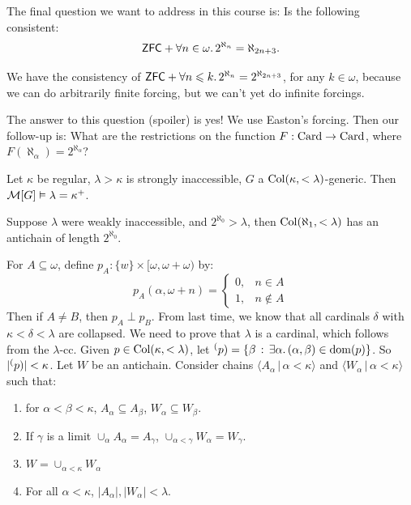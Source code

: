 \documentclass{article}
\begin{document}
    The final question we want to address in this course is: Is the following consistent: \[ \mathsf{ZFC} + \forall n \in \omega. \, 2^{\aleph_{n}} = \aleph_{2n+3}.\]
    \begin{remark*}
        We have the consistency of $\mathsf{ZFC} + \forall n \leqslant k. \, 2^{\aleph_{n}}=2^{\aleph_{2n+3}}$, for any $k \in \omega$, because we can do arbitrarily finite forcing, but we can't yet do infinite forcings.
    \end{remark*}
    The answer to this question (spoiler) is yes! We use Easton's forcing. Then our follow-up is: What are the restrictions on the function $F : \operatorname{Card} \to \operatorname{Card}$, where $F(\aleph_{\alpha})=2^{\aleph_{\alpha}}$?\gap
    \newlec
    \begin{fancythm}{}
        Let $\kappa$ be regular, $\lambda > \kappa$ is strongly inaccessible, $G$ a $\operatorname{Col}(\kappa, <\lambda)$-generic. Then $\mathcal{M}[G] \vDash \lambda = \kappa^{+}$.
    \end{fancythm}
    \begin{remark*}
        Suppose $\lambda$ were weakly inaccessible, and $2^{\aleph_{0}}>\lambda$, then $\operatorname{Col}(\aleph_{1},<\lambda)$ has an antichain of length $2^{\aleph_{0}}$.
    \end{remark*}
    \proof For $A \subseteq \omega$, define $p_{A} : \{w\} \times [\omega, \omega + \omega)$ by: \[ p_{A}(\alpha, \omega + n) = \begin{cases}
            0, & n \in A    \\
            1, & n \notin A
        \end{cases}\]
    Then if $A \neq B$, then $p_{A} \perp p_{B}$.
    From last time, we know that all cardinals $\delta$ with $\kappa < \delta < \lambda$ are collapsed. We need to prove that $\lambda$ is a cardinal, which follows from the $\lambda$-cc. Given $p \in \operatorname{Col}(\kappa, <\lambda)$, let $\sp(p)= \{ \beta \, : \, \exists \alpha. \, (\alpha, \beta) \in \operatorname{dom}(p)\}$. So $|\sp(p)| < \kappa$.\gap
    Let $W$ be an antichain. Consider chains $\langle A_{\alpha} \, | \, \alpha < \kappa\rangle$ and $\langle W_{\alpha} \, | \, \alpha < \kappa\rangle$ such that: \begin{enumerate}
        \item for $\alpha < \beta < \kappa$, $A_{\alpha} \subseteq A_{\beta}$, $W_{\alpha} \subseteq W_{\beta}$.
        \item If $\gamma$ is a limit $\cup_{\alpha} A_{\alpha} = A_{\gamma}$, $\cup_{\alpha < \gamma} W_{\alpha} = W_{\gamma}$.
        \item $W = \cup_{\alpha < \kappa} W_{\alpha}$
        \item For all $\alpha < \kappa$, $|A_{\alpha}|, |W_{\alpha}| < \lambda$.
    \end{enumerate}
\end{document}
